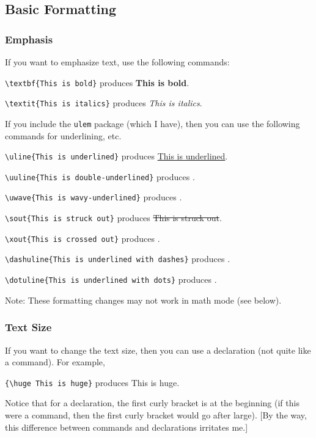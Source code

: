 \documentclass[12pt]{article}
\begin{document}
\subsection{Basic Formatting}

\subsubsection{Emphasis}

If you want to emphasize text, use the following commands:

\verb|\textbf{This is bold}| produces \textbf{This is bold}.

\verb|\textit{This is italics}| produces \textit{This is italics}.

If you include the \texttt{ulem} package (which I have), then you can use the following commands for underlining, etc.

\verb|\uline{This is underlined}| produces \uline{This is underlined}.

\verb|\uuline{This is double-underlined}| produces .

\verb|\uwave{This is wavy-underlined}| produces .

\verb|\sout{This is struck out}| produces \sout{This is struck out}.

\verb|\xout{This is crossed out}| produces .

\verb|\dashuline{This is underlined with dashes}| produces .

\verb|\dotuline{This is underlined with dots}| produces .

Note: These formatting changes may not work in math mode (see below).

\subsubsection{Text Size}

If you want to change the text size, then you can use a declaration (not quite like a command). For example,


\verb|{\huge This is huge}| produces {\huge This is huge}.

Notice that for a declaration, the first curly bracket is at the beginning (if this were a command, then the first curly bracket would go after large). [By the way, this difference between commands and declarations irritates me.]
\end{document}
